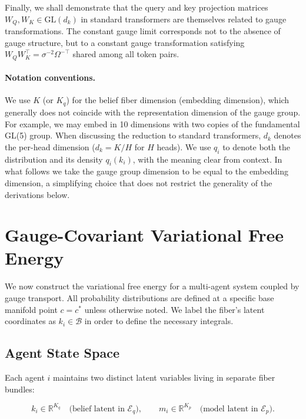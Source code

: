 \documentclass[twoside,11pt]{article}
\begin{document}
Finally, we shall demonstrate that the query and key projection matrices $W_Q, W_K \in \mathrm{GL}(d_k)$ in standard transformers are themselves related to gauge transformations. The constant gauge limit corresponds not to the absence of gauge structure, but to a constant gauge transformation satisfying $W_Q W_K^\top = \sigma^{-2}\Omega^{-\top}$ shared among all token pairs.


\paragraph{Notation conventions.} We use $K$ (or $K_q$) for the belief fiber dimension (embedding dimension), which generally does not coincide with the representation dimension of the gauge group. For example, we may embed in 10 dimensions with two copies of the fundamental GL(5) group. When discussing the reduction to standard transformers, $d_k$ denotes the per-head dimension ($d_k = K/H$ for $H$ heads). We use $q_i$ to denote both the distribution and its density $q_i(k_i)$, with the meaning clear from context. In what follows we take the gauge group dimension to be equal to the embedding dimension, a simplifying choice that does not restrict the generality of the derivations below.

\section{Gauge-Covariant Variational Free Energy}
\label{sec:free_energy_section}

We now construct the variational free energy for a multi-agent system coupled by gauge transport. All probability distributions are defined at a specific base manifold point $c = c^*$ unless otherwise noted. We label the fiber's latent coordinates as $k_i \in \mathcal{B}$ in order to define the necessary integrals.

\subsection{Agent State Space}

Each agent $i$ maintains two distinct latent variables living in separate fiber bundles:

\begin{equation}
k_i \in \mathbb{R}^{K_q} \quad \text{(belief latent in $\mathcal{E}_q$)},
\qquad
m_i \in \mathbb{R}^{K_p} \quad \text{(model latent in $\mathcal{E}_p$)}.
\label{eq:dual_latents}
\end{equation}
\end{document}
